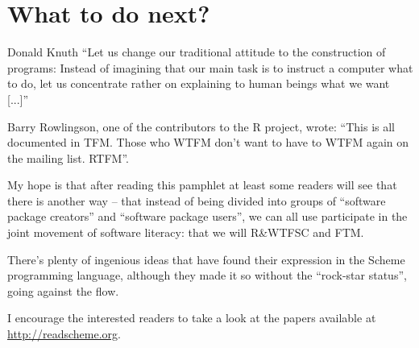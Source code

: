 \chapter*{What to do next?}

\begin{chapquote}{Donald Knuth}
``Let us change our traditional attitude to the construction
of programs: Instead of imagining that our main task is to
instruct a computer what to do, let us concentrate rather
on explaining to human beings what we want [...]''
\end{chapquote}

Barry Rowlingson, one of the contributors to the R project,
wrote: ``This is all documented in TFM. Those who WTFM
don't want to have to WTFM again on the mailing list. RTFM''.

My hope is that after reading this pamphlet at least some
readers will see that there is another way -- that instead
of being divided into groups of ``software package creators''
and ``software package users'', we can all use participate
in the joint movement of software literacy: that we will
R\&WTFSC and FTM. 

There's plenty of ingenious ideas that have found their
expression in the Scheme programming language, although
they made it so without the ``rock-star status'', going
against the flow.

I encourage the interested readers to take a look at the papers
available at \url{http://readscheme.org}.

